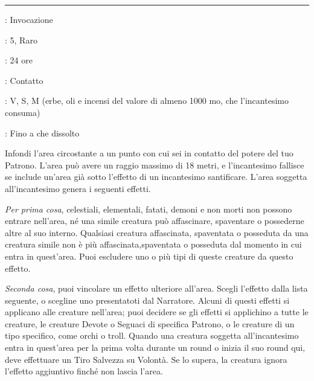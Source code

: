 \begin{multicols}{2}
\smallskip\noindent\rule{\linewidth}{2pt} \hypertarget{Santificare}{}\medskip{}
\noindent
\begin{description}[noitemsep, topsep=0pt, parsep=0pt, partopsep=0pt, leftmargin=0cm, labelwidth=2.8cm]
	\item[\textbf{Lista di Magia}]: Invocazione
	\item[\textbf{Livello}]: 5, Raro
	\item[\textbf{T. di Lancio}]: 24 ore
	\item[\textbf{Gittata}]: Contatto
	\item[\textbf{Componenti}]: V, S, M (erbe, oli e incensi del valore di almeno 1000 mo, che l'incantesimo consuma)
	\item[\textbf{Durata}]: Fino a che dissolto
\end{description}

Infondi l'area circostante a un punto con cui sei in contatto del potere del tuo Patrono. L'area può avere un raggio massimo di 18 metri, e l'incantesimo fallisce se include un'area già sotto l'effetto di un incantesimo santificare. L'area soggetta all'incantesimo genera i seguenti effetti.

\emph{Per prima cosa}, celestiali, elementali, fatati, demoni e non morti non possono entrare nell'area, né una simile creatura può affascinare, spaventare o possederne altre al suo interno. Qualsiasi creatura affascinata, spaventata o posseduta da una creatura simile non è più affascinata,spaventata o posseduta dal momento in cui entra in quest'area. Puoi escludere uno o più tipi di queste creature da questo effetto.

\emph{Seconda cosa}, puoi vincolare un effetto ulteriore all'area. Scegli l'effetto dalla lista seguente, o scegline uno presentatoti dal Narratore. Alcuni di questi effetti si applicano alle creature nell'area; puoi decidere se gli effetti si applichino a tutte le creature, le creature Devote o Seguaci di specifica Patrono, o le creature di un tipo specifico, come orchi o troll. Quando una creatura soggetta all'incantesimo entra in quest'area per la prima volta durante un round o inizia il suo round qui, deve effettuare un Tiro Salvezza su Volontà. Se lo supera, la creatura ignora l'effetto aggiuntivo finché non lascia l'area.


\end{multicols}
